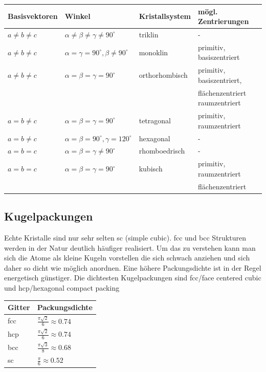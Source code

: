 \documentclass[bfvec]{summery_5.0}
\begin{document}
\begin{table}[H]
\centering
\begin{tabular}{@{}llll@{}}
    \toprule
    Basisvektoren & Winkel & Kristallsystem & mögl. Zentrierungen \\
    \midrule
    $a\neq b\neq c$ & $\alpha\neq\beta\neq\gamma \neq 90^\circ$ & triklin & \hfill-\hspace*{\fill}\\\hdashline
    $a\neq b\neq c$ & $\alpha=\gamma= 90^\circ, \beta \neq 90^\circ$ & monoklin & primitiv, basiszentriert\\\hdashline
    $a\neq b\neq c$ & $\alpha=\beta=\gamma=90^\circ$ & orthorhombisch & primitiv, basiszentriert, \\
    &&&flächenzentriert raumzentriert\\\hdashline
    $a= b\neq c$ & $\alpha=\beta =\gamma= 90^\circ$ & tetragonal & primitiv, raumzentriert\\\hdashline
    $a= b\neq c$ & $\alpha=\beta=90^\circ, \gamma= 120^\circ$ & hexagonal & \hfill-\hspace*{\fill}\\\hdashline
    $a= b= c$ & $\alpha=\beta=\gamma\neq 90^\circ$ & rhomboedrisch & \hfill-\hspace*{\fill}\\\hdashline
    $a= b= c$ & $\alpha=\beta=\gamma= 90^\circ$ & kubisch & primitiv, raumzentriert\\
    &&&flächenzentriert\\
    \bottomrule
\end{tabular}
\end{table}

\subsection{Kugelpackungen}
Echte Kristalle sind nur sehr selten sc (simple cubic). fcc und bcc Strukturen werden in der Natur deutlich häufiger realisiert. Um das zu verstehen kann man sich die Atome als kleine Kugeln vorstellen die sich schwach anziehen und sich daher so dicht wie möglich anordnen. Eine höhere Packungsdichte ist in der Regel energetisch günstiger. Die dichtesten Kugelpackungen sind fcc/face centered cubic und hcp/hexagonal compact packing

\begin{table}[H]
\centering
\begin{tabular}{@{}ll@{}}
    \toprule
    Gitter & Packungsdichte \\
    \midrule
    fcc & $\frac{\pi \sqrt 2}{6}\approx0.74$\\
    hcp & $\frac{\pi \sqrt 2}{6}\approx0.74$\\
    bcc & $\frac{\pi \sqrt3}{8}\approx0.68$\\
    sc & $\frac{\pi}{6}\approx0.52$\\
    \bottomrule
\end{tabular}
\end{table}
\end{document}
